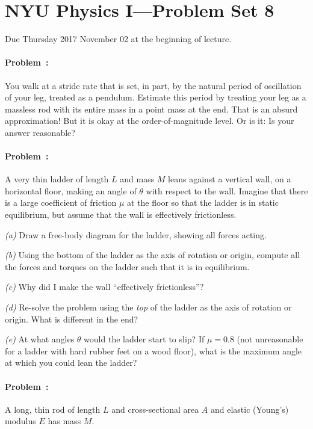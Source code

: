 \documentclass[12pt]{article}
\begin{document}
\section*{NYU Physics I---Problem Set 8}

Due Thursday 2017 November 02 at the beginning of lecture.

\paragraph{Problem~\theproblem:}%
You walk at a stride rate that is set, in part, by the natural period of
oscillation of your leg, treated as a pendulum.  Estimate this
period by treating your leg as a massless rod with its entire mass in a point mass at
the end. That is an absurd approximation! But it is okay at the order-of-magnitude
level. Or is it: Is your answer reasonable?

\paragraph{Problem~\theproblem:}%
A very thin ladder of length $L$ and mass $M$ leans against a vertical
wall, on a horizontal floor, making an angle of $\theta$ with respect
to the wall.  Imagine that there is a large coefficient of friction
$\mu$ at the floor so that the ladder is in static
equilibrium, but assume that the wall is effectively frictionless.

\textsl{(a)} Draw a free-body diagram for the ladder, showing all
forces acting.

\textsl{(b)} Using the bottom of the ladder as the axis of rotation or
origin, compute all the forces and torques on the ladder such that it
is in equilibrium.

\textsl{(c)} Why did I make the wall ``effectively frictionless''?

\textsl{(d)} Re-solve the problem using the \emph{top} of the ladder
as the axis of rotation or origin.  What is different in the end?

\textsl{(e)} At what angles $\theta$ would the ladder start to slip?
If $\mu=0.8$ (not unreasonable for a ladder with hard rubber feet on a wood
floor), what is the maximum angle at which you could lean the ladder?

\paragraph{Problem~\theproblem:}%
A long, thin rod of length $L$ and cross-sectional area $A$ and
elastic (Young's) modulus $E$ has mass $M$.
\end{document}
